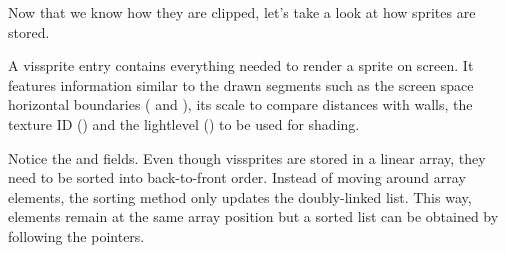 \par
{} 
\par
{}
\par
Now that we know how they are clipped, let's take a look at how sprites are stored.\\
\par
{}
\par
A vissprite entry contains everything needed to render a sprite on screen. It features information similar to the drawn segments such as the screen space horizontal boundaries ( and ), its scale to compare distances with walls, the texture ID () and the lightlevel () to be used for shading.\\
\par
Notice the  and  fields. Even though vissprites are stored in a linear array, they need to be sorted into back-to-front order. Instead of moving around array elements, the sorting method only updates the doubly-linked list. This way, elements remain at the same array position but a sorted list can be obtained by following the  pointers.
\newpage





